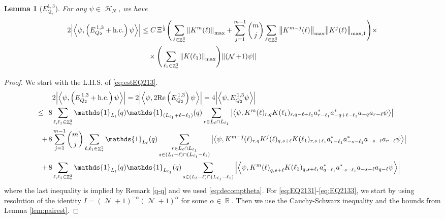\documentclass[sn-mathphys, Numbered ,a4paper]{sn-jnl}%
\DeclareMathOperator{\R}{\mathbb{R}}
\DeclareMathOperator{\Z}{\mathbb{Z}}
\DeclareMathOperator{\HH}{\mathcal{H}}
\DeclareMathOperator{\NN}{\mathcal{N}}
\newcommand{\half}{\frac{1}{2}}
\newcommand{\eva}[1]{\left\langle #1 \right\rangle}
\theoremstyle{plain}
\newtheorem{lemma}[theorem]{Lemma}
\theoremstyle{definition}
\theoremstyle{remark}
\theoremstyle{plain}
\theoremstyle{definition}
\theoremstyle{remark}
\begin{document}
\begin{lemma}[$E_{Q_2}^{1,3}$]
For any $\psi \in \HH_N$, we have
\begin{align}
	2\abs{\eva{\psi,\left(E^{\,1,3}_{Q_2}+\mathrm{h.c.}\right) \psi }}
  	&\leq  C\, \Xi^{\half} \Bigg(\sum\limits_{\ell \in \Z^3_*} \norm{K^m(\ell)}_{\mathrm{max}} + \sum\limits_{j=1}^{m-1} {m\choose j} \sum\limits_{\ell \in \Z^3_*}\norm{K^{m-j}(\ell)}_{\mathrm{max}}\norm{K^{j}(\ell)}_{\mathrm{max,1}}\Bigg)\times\nonumber\\&\quad\times \Bigg( \sum\limits_{\ell_1 \in \Z^3_*}\norm{K(\ell_1)}_{\mathrm{max}} \Bigg)  \norm { (\NN+1) \psi }    \label{eq:estEQ213}
\end{align}
\end{lemma}
\begin{proof}
We start with the L.H.S. of \eqref{eq:estEQ213}.
\begin{align}
	&2\abs{\eva{\psi,\left(E^{\,1,3}_{Q_2}+\mathrm{h.c.}\right) \psi }} = 2\abs{\eva{\psi,2\mathrm{Re}\left(E^{\,1,3}_{Q_2}\right) \psi }} = 4\abs{\eva{\psi, E^{\,1,3}_{Q_2} \psi }}\nonumber\\
    \leq\,\;8& \sum\limits_{\ell, \ell_1\in \Z^3_*} \mathds{1}_{L_{\ell}}(q) \mathds{1}_{(L_{\ell_1}+\ell-\ell_1)}(q) \sum\limits_{r\in L_{\ell} \cap L_{\ell_1}} \abs{\eva{\psi, K^m(\ell)_{r,q}K(\ell_1)_{r,q-\ell+\ell_1}a^*_{r-\ell_1}a^*_{-q+\ell-\ell_1} a_{-q}a_{r-\ell} \psi }}\label{eq:EQ2131}\\
    +\,8& \sum\limits_{j=1}^{m-1} {{m}\choose j} \sum\limits_{\ell, \ell_1\in \Z^3_*}\mathds{1}_{L_{\ell}}(q) \sum\limits_{\substack{r\in L_{\ell} \cap L_{\ell_1}\\ s \in (L_{\ell}-\ell) \cap (L_{\ell_1}-\ell_1)}}  \abs{\eva{\psi, K^{m-j}(\ell)_{r,q} K^{j}(\ell)_{q,s+\ell} K(\ell_1)_{r,s+\ell_1}a^*_{r-\ell_1}a^*_{-s-\ell_1} a_{-s-\ell}a_{r-\ell}  \psi }}\label{eq:EQ2132}\\
    +\,8&\sum\limits_{\ell, \ell_1\in \Z^3_*} \mathds{1}_{L_{\ell}}(q) \mathds{1}_{L_{\ell_1}}(q) \sum\limits_{ s \in (L_{\ell}-\ell) \cap (L_{\ell_1}-\ell_1)} \abs{\eva{\psi, K^m{(\ell)}_{q,s+\ell} K(\ell_1)_{q,s+\ell_1} a^*_{q-\ell_1} a^*_{-s-\ell_1} a_{-s-\ell} a_{q-\ell} \psi }}\label{eq:EQ2133}
\end{align}
where the last inequality is implied by Remark \ref{q-q} and we used \eqref{eq:decomptheta}.
For \eqref{eq:EQ2131}-\eqref{eq:EQ2133}, we start by using resolution of the identity $I = (\NN+1)^{-\alpha}(\NN+1)^{\alpha}$ for some $\alpha \in \R$. Then we use the Cauchy-Schwarz inequality and the bounds from Lemma \ref{lem:pairest}.

\end{proof}
\end{document}
